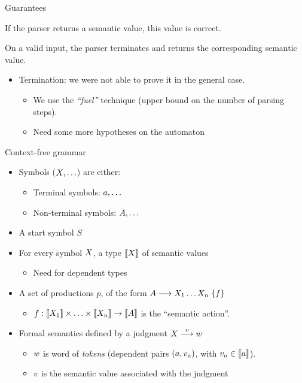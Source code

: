 \documentclass{beamer}
\begin{document}

\begin{frame}{Guarantees}
  \begin{theorem}[Soundness]
    If the parser returns a semantic value, this value is correct.
  \end{theorem}
  \begin{theorem}[Completeness]
    On a valid input, the parser terminates and returns the corresponding semantic value.
  \end{theorem}
  \begin{itemize}
  \item Termination: we were not able to prove it in the general case.
    \begin{itemize}
    \item We use the \emph{``fuel''} technique (upper bound on the number of parsing steps).
    \item Need some more hypotheses on the automaton
    \end{itemize}
  \end{itemize}
\end{frame}

\begin{frame}{Context-free grammar}
\begin{itemize}
\item Symbols ($X, \ldots$) are either:
  \begin{itemize}
  \item Terminal symbols: $a, \ldots$ 
  \item Non-terminal symbols: $A, \ldots$
  \end{itemize}
\item A start symbol $S$
\item For every symbol $X$, a type $\llbracket X\rrbracket$ of semantic values
  \begin{itemize}
  \item Need for dependent types
  \end{itemize}
\item A set of productions $p$, of the form $A\longrightarrow X_1\ldots X_n\;\{f\}$
  \begin{itemize}
  \item $f : \llbracket X_1\rrbracket \times \ldots \times \llbracket X_n\rrbracket \rightarrow \llbracket A\rrbracket$ is the ``semantic action''.
  \end{itemize}
\item Formal semantics defined by a judgment $X\stackrel{v}{\longrightarrow}w$
  \begin{itemize}
  \item $w$ is word of \emph{tokens} (dependent pairs $(a,
    v_a)$, with $v_a \in \llbracket a\rrbracket$).
  \item $v$ is the semantic value associated with the judgment
  \end{itemize}
\end{itemize}
\end{frame}
\end{document}
